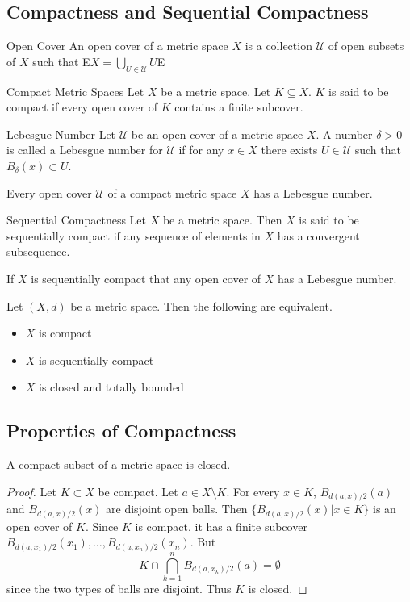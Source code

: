 \documentclass[a4paper]{article}
\begin{document}
\subsection{Compactness and Sequential Compactness}
\begin{defn}{Open Cover}{} An open cover of a metric space $X$ is a collection $\mathcal{U}$ of open subsets of $X$ such that E$X=\bigcup_{U\in\mathcal{U}}U$E
\end{defn}

\begin{defn}{Compact Metric Spaces}{} Let $X$ be a metric space. Let $K\subseteq X$. $K$ is said to be compact if every open cover of $K$ contains a finite subcover. 
\end{defn}

\begin{defn}{Lebesgue Number}{} Let $\mathcal{U}$ be an open cover of a metric space $X$. A number $\delta>0$ is called a Lebesgue number for $\mathcal{U}$ if for any $x\in X$ there exists $U\in\mathcal{U}$ such that $B_\delta(x)\subset U$. 
\end{defn}

\begin{lmm}{}{} Every open cover $\mathcal{U}$ of a compact metric space $X$ has a Lebesgue number. 
\end{lmm}

\begin{defn}{Sequential Compactness}{} Let $X$ be a metric space. Then $X$ is said to be sequentially compact if any sequence of elements in $X$ has a convergent subsequence. 
\end{defn}

\begin{lmm}{}{} If $X$ is sequentially compact that any open cover of $X$ has a Lebesgue number. 
\end{lmm}

\begin{prp}{}{} Let $(X,d)$ be a metric space. Then the following are equivalent. 
\begin{itemize}
\item $X$ is compact
\item $X$ is sequentially compact
\item $X$ is closed and totally bounded
\end{itemize}
\end{prp}

\subsection{Properties of Compactness}
\begin{prp}{}{} A compact subset of a metric space is closed. 
\begin{proof}
Let $K\subset X$ be compact. Let $a\in X\setminus K$. For every $x\in K$, $B_{d(a,x)/2}(a)$ and $B_{d(a,x)/2}(x)$ are disjoint open balls. Then $\{B_{d(a,x)/2}(x)|x\in K\}$ is an open cover of $K$. Since $K$ is compact, it has a finite subcover $B_{d(a,x_1)/2}(x_1),\dots,B_{d(a,x_n)/2}(x_n)$. But $$K\cap\bigcap_{k=1}^nB_{d(a,x_k)/2}(a)=\emptyset$$ since the two types of balls are disjoint. Thus $K$ is closed. 
\end{proof}
\end{prp}
\end{document}
